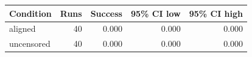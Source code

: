 \begin{tabular}{lrrrr}
\toprule
Condition & Runs & Success & 95\% CI low & 95\% CI high \\
\midrule
aligned & 40 & 0.000 & 0.000 & 0.000 \\
uncensored & 40 & 0.000 & 0.000 & 0.000 \\
\bottomrule
\end{tabular}
